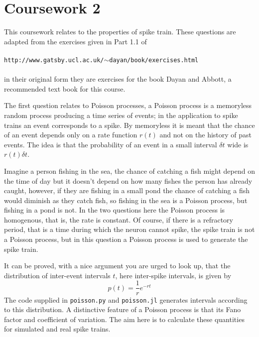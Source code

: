 \documentclass[12pt]{article}
\begin{document}
\section*{Coursework 2}

This coursework relates to the properties of spike train. These
questions are adapted from the exercises given in Part 1.1 of\\
\\
\texttt{http://www.gatsby.ucl.ac.uk/$\sim$dayan/book/exercises.html}\\ 
\\
in their original form they are exercises for the book Dayan and Abbott,
a recommended text book for this course.

The first question relates to Poisson processes, a Poisson process
is a memoryless random process producing a time series of events; in
the application to spike trains an event corresponds to a spike. By
memoryless it is meant that the chance of an event depends only on a
rate function $r(t)$ and not on the history of past events. The idea
is that the probability of an event in a small interval $\delta t$ wide is $r(t)\delta t$.

Imagine a person fishing in the sea, the chance of catching a fish
might depend on the time of day but it doesn't depend on how many
fishes the person has already caught, however, if they are fishing in
a small pond the chance of catching a fish would diminish as they
catch fish, so fishing in the sea is a Poisson process, but fishing in
a pond is not. In the two questions here the Poisson process is
homogenous, that is, the rate is constant. Of course, if there is a
refractory period, that is a time during which the neuron cannot
spike, the spike train is not a Poisson process, but in this question
a Poisson process is used to generate the spike train.

It can be proved, with a nice argument you are urged to look up, that
the distribution of inter-event intervals $t$, here inter-spike intervals,
is given by
\begin{equation}
p(t)=\frac{1}{r}e^{-rt}
\end{equation}
The code supplied in \texttt{poisson.py} and \texttt{poisson.jl}
generates intervals according to this distribution. A distinctive
feature of a Poisson process is that its Fano factor and coefficient
of variation. The aim here is to calculate these quantities for
simulated and real spike trains.
\end{document}

